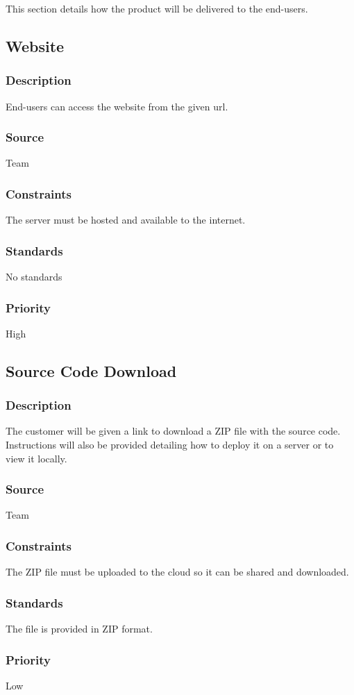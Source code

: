 
This section details how the product will be delivered to the
end-users.

\subsection{Website}
\subsubsection{Description}
End-users can access the website from the given url.
\subsubsection{Source}
Team
\subsubsection{Constraints}
The server must be hosted and available to the internet.
\subsubsection{Standards}
No standards
\subsubsection{Priority}
High

\subsection{Source Code Download}
\subsubsection{Description}
The customer will be given a link to download a ZIP file with
the source code. Instructions will also be provided detailing
how to deploy it on a server or to view it locally.
\subsubsection{Source}
Team
\subsubsection{Constraints}
The ZIP file must be uploaded to the cloud so it can be shared
and downloaded.
\subsubsection{Standards}
The file is provided in ZIP format.
\subsubsection{Priority}
Low